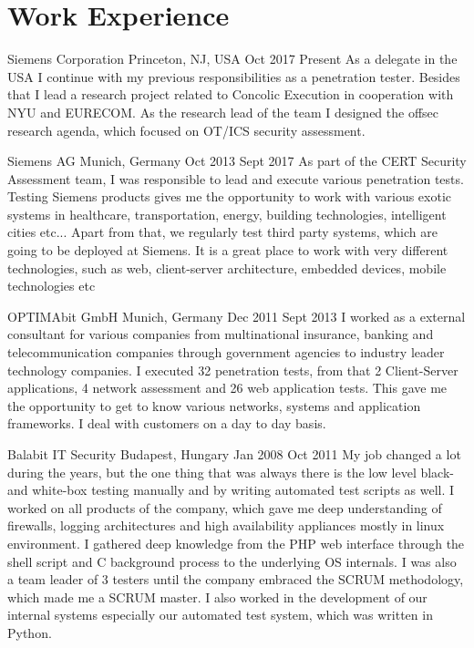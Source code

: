 

\section{Work Experience}

{Siemens Corporation}
{Princeton, NJ, USA}
{Oct 2017}
{Present}
{As a delegate in the USA I continue with my previous responsibilities as a penetration tester. Besides that I lead a research project related to Concolic Execution in cooperation with NYU and EURECOM. As the research lead of the team I designed the offsec research agenda, which focused on OT/ICS security assessment.}

{Siemens AG}
{Munich, Germany}
{Oct 2013}
{Sept 2017}
{As part of the CERT Security Assessment team, I was responsible to lead and execute various penetration tests. Testing Siemens products gives me the opportunity to work with various exotic systems in healthcare, transportation, energy, building technologies, intelligent cities etc... Apart from that, we regularly test third party systems, which are going to be deployed at Siemens. It is a great place to work with very different technologies, such as web, client-server architecture, embedded devices, mobile technologies etc}

{OPTIMAbit GmbH}
{Munich, Germany}
{Dec 2011}
{Sept 2013}
{I worked as a external consultant for various companies from multinational insurance, banking and telecommunication companies through government agencies to industry leader technology companies. I executed 32 penetration tests, from that 2 Client-Server applications, 4 network assessment and 26 web application tests. This gave me the opportunity to get to know various networks, systems and application frameworks. I deal with customers on a day to day basis.}

{Balabit IT Security}
{Budapest, Hungary}
{Jan 2008}
{Oct 2011}
{My job changed a lot during the years, but the one thing that was always there is the low level black- and white-box testing manually and by writing automated test scripts as well. I worked on all products of the company, which gave me deep understanding of firewalls, logging architectures and high availability appliances mostly in linux environment. I gathered deep knowledge from the PHP web interface through the shell script and C background process to the underlying OS internals. I was also a team leader of 3 testers until the company embraced the SCRUM methodology, which made me a SCRUM master. I also worked in the development of our internal systems especially our automated test system, which was written in Python.
}

